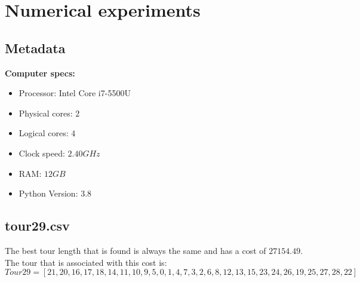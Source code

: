 \documentclass[a4paper,10pt]{article}
\newcommand{\ReplaceMe}[1]{{\color{blue}#1}}
\begin{document}
\section{Numerical experiments}

\subsection{Metadata}

%


\textbf{Computer specs:}
\begin{itemize}
	\item Processor: Intel Core i7-5500U
	\item Physical cores: $ 2 $
	\item Logical cores: $ 4 $
	\item Clock speed: $ 2.40GHz $
	\item RAM: $ 12 GB $
	\item Python Version: $ 3.8 $
\end{itemize}


\subsection{tour29.csv}

The best tour length that is found is always the same and has a cost of $ 27154.49 $.
The tour that is associated with this cost is: \\
\begin{equation*}
Tour 29  = 	[21, 20, 16, 17, 18, 14, 11, 10, 9, 5, 0, 1, 4, 7, 3, 2, 6, 8, 12, 13, 15, 23, 24, 26, 19, 25, 27, 28, 22]
\end{equation*}
\end{document}
